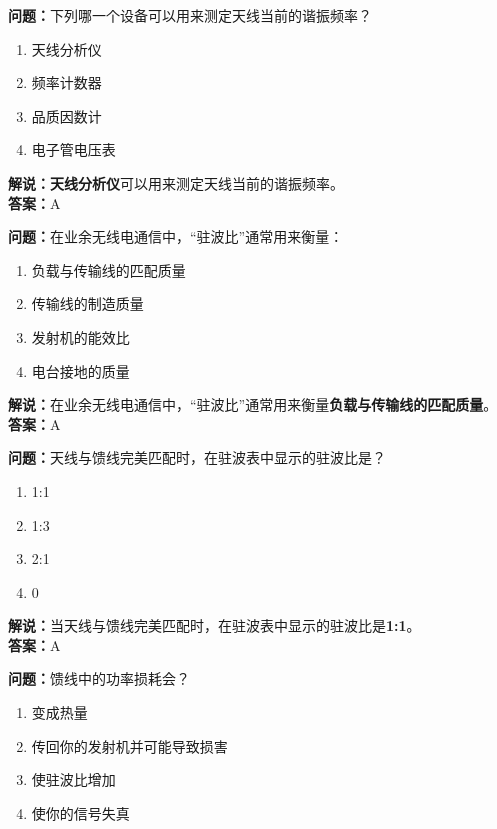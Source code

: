 \textbf{问题：}下列哪一个设备可以用来测定天线当前的谐振频率？

\begin{enumerate}[label=\Alph*), leftmargin=1cm]
	\item 天线分析仪
	\item 频率计数器
	\item 品质因数计
	\item 电子管电压表
\end{enumerate}

\textbf{解说：}\textbf{天线分析仪}可以用来测定天线当前的谐振频率。\\\textbf{答案：}A



\textbf{问题：}在业余无线电通信中，“驻波比”通常用来衡量：

\begin{enumerate}[label=\Alph*), leftmargin=1cm]
	\item 负载与传输线的匹配质量
	\item 传输线的制造质量
	\item 发射机的能效比
	\item 电台接地的质量
\end{enumerate}

\textbf{解说：}在业余无线电通信中，“驻波比”通常用来衡量\textbf{负载与传输线的匹配质量}。\\\textbf{答案：}A



\textbf{问题：}天线与馈线完美匹配时，在驻波表中显示的驻波比是？

\begin{enumerate}[label=\Alph*), leftmargin=1cm]
	\item 1:1
	\item 1:3
	\item 2:1
	\item 0
\end{enumerate}

\textbf{解说：}当天线与馈线完美匹配时，在驻波表中显示的驻波比是\textbf{1:1}。\\\textbf{答案：}A



\textbf{问题：}馈线中的功率损耗会？

\begin{enumerate}[label=\Alph*), leftmargin=1cm]
	\item 变成热量
	\item 传回你的发射机并可能导致损害
	\item 使驻波比增加
	\item 使你的信号失真
\end{enumerate}

